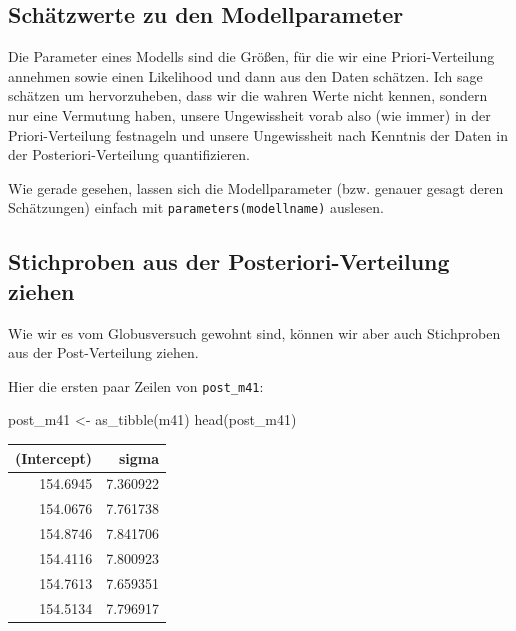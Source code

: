 \documentclass[
  a4paper,
  DIV=11]{scrreprt}
\newenvironment{Shaded}{\begin{snugshade}}{\end{snugshade}}
\newcommand{\FunctionTok}[1]{\textcolor[rgb]{0.28,0.35,0.67}{#1}}
\newcommand{\NormalTok}[1]{\textcolor[rgb]{0.00,0.23,0.31}{#1}}
\newcommand{\OtherTok}[1]{\textcolor[rgb]{0.00,0.23,0.31}{#1}}
\theoremstyle{definition}
\theoremstyle{remark}
\begin{document}
\hypertarget{schuxe4tzwerte-zu-den-modellparameter}{%
\subsection{Schätzwerte zu den
Modellparameter}\label{schuxe4tzwerte-zu-den-modellparameter}}

Die Parameter eines Modells sind die Größen, für die wir eine
Priori-Verteilung annehmen sowie einen Likelihood und dann aus den Daten
schätzen. Ich sage schätzen um hervorzuheben, dass wir die wahren Werte
nicht kennen, sondern nur eine Vermutung haben, unsere Ungewissheit
vorab also (wie immer) in der Priori-Verteilung festnageln und unsere
Ungewissheit nach Kenntnis der Daten in der Posteriori-Verteilung
quantifizieren.

Wie gerade gesehen, lassen sich die Modellparameter (bzw. genauer gesagt
deren Schätzungen) einfach mit \texttt{parameters(modellname)} auslesen.

\hypertarget{stichproben-aus-der-posteriori-verteilung-ziehen}{%
\subsection{Stichproben aus der Posteriori-Verteilung
ziehen}\label{stichproben-aus-der-posteriori-verteilung-ziehen}}

Wie wir es vom Globusversuch gewohnt sind, können wir aber auch
Stichproben aus der Post-Verteilung ziehen.

Hier die ersten paar Zeilen von \texttt{post\_m41}:

\begin{Shaded}
\begin{Highlighting}[]
\NormalTok{post\_m41 }\OtherTok{\textless{}{-}} \FunctionTok{as\_tibble}\NormalTok{(m41)}
\FunctionTok{head}\NormalTok{(post\_m41)}
\end{Highlighting}
\end{Shaded}

\begin{longtable}[]{@{}rr@{}}
\toprule()
(Intercept) & sigma \\
\midrule()
\endhead
154.6945 & 7.360922 \\
154.0676 & 7.761738 \\
154.8746 & 7.841706 \\
154.4116 & 7.800923 \\
154.7613 & 7.659351 \\
154.5134 & 7.796917 \\
\bottomrule()
\end{longtable}
\end{document}

